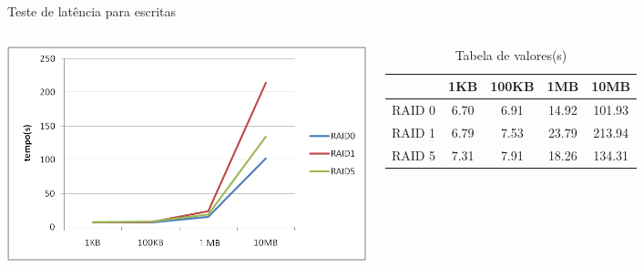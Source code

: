 \begin{frame}{}
	Teste de latência para escritas
	\begin{columns}
		
		\includegraphics[width=\textwidth]{imagens/latencia_escrita}
		
		
		\begin{table}
			\caption{Tabela de valores(s)}
			\tiny
			\begin{tabular}{|c|c|c|c|c|} \hline
				& 1KB  & 100KB & 1MB   & 10MB \\ \hline
				RAID 0	& 6.70 & 6.91 & 14.92 & 101.93\\ \hline
				RAID 1	& 6.79 & 7.53 & 23.79 & 213.94\\ \hline
				RAID 5	& 7.31 & 7.91 & 18.26 & 134.31\\ \hline
				
				
			\end{tabular}
		\end{table}
		
	\end{columns}
\end{frame}


